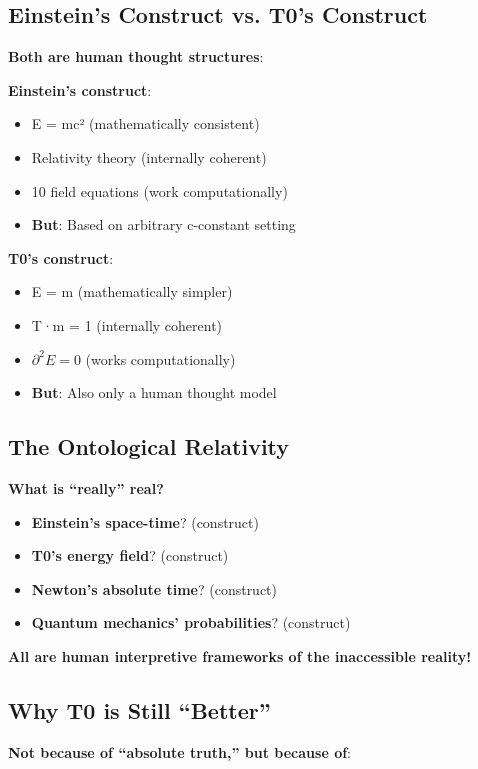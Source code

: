 	\subsection{Einstein's Construct vs. T0's Construct}
	
	\textbf{Both are human thought structures}:
	
	\textbf{Einstein's construct}:
	\begin{itemize}
		\item E = mc² (mathematically consistent)
		\item Relativity theory (internally coherent)
		\item 10 field equations (work computationally)
		\item \textbf{But}: Based on arbitrary c-constant setting
	\end{itemize}
	
	\textbf{T0's construct}:
	\begin{itemize}
		\item E = m (mathematically simpler)
		\item T·m = 1 (internally coherent)
		\item $\partial^2 E = 0$ (works computationally)
		\item \textbf{But}: Also only a human thought model
	\end{itemize}
	
	\subsection{The Ontological Relativity}
	
	\textbf{What is ``really'' real?}
	\begin{itemize}
		\item \textbf{Einstein's space-time}? (construct)
		\item \textbf{T0's energy field}? (construct)
		\item \textbf{Newton's absolute time}? (construct)
		\item \textbf{Quantum mechanics' probabilities}? (construct)
	\end{itemize}
	
	\textbf{All are human interpretive frameworks of the inaccessible reality!}
	
	\subsection{Why T0 is Still ``Better''}
	
	\textbf{Not because of ``absolute truth,'' but because of}:
	
